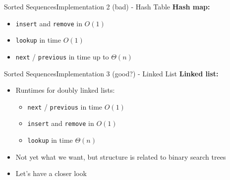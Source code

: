 \begin{frame}{Sorted Sequences}{Implementation 2 (bad) - Hash Table}
  \textbf{Hash map:}
  \begin{itemize}
    \item<2->
      {\color{MainA}\texttt{insert}} and
      {\color{MainA}\texttt{remove}} in $O(1)$\\[0.5em]
      \vspace{1em}
    \item<4->
      {\color{MainA}\texttt{lookup}} in time $O(1)$\\[0.5em]
      \vspace{1em}
    \item<5->
      {\color{MainA}\texttt{next}} /
      {\color{MainA}\texttt{previous}} in time up to $\Theta(n)$\\[0.5em]
  \end{itemize}
\end{frame}


\begin{frame}{Sorted Sequences}{Implementation 3 (good?) - Linked List}
  \textbf{Linked list:}
  \begin{itemize}
  \item<2-> Runtimes for doubly linked lists:
    \begin{itemize}
    \item<3->
      {\color{MainA}\texttt{next}} /
      {\color{MainA}\texttt{previous}} in time $O(1)$\\
    \item<4->
      {\color{MainA}\texttt{insert}} and
      {\color{MainA}\texttt{remove}} in $O(1)$
    \item<5->
      {\color{MainA}\texttt{lookup}} in time $\Theta(n)$\\
    \end{itemize}
  \item<6-> Not yet what we want, but structure is related
    to binary search trees
  \item<7->Let's have a closer look
  \end{itemize}
\end{frame}
